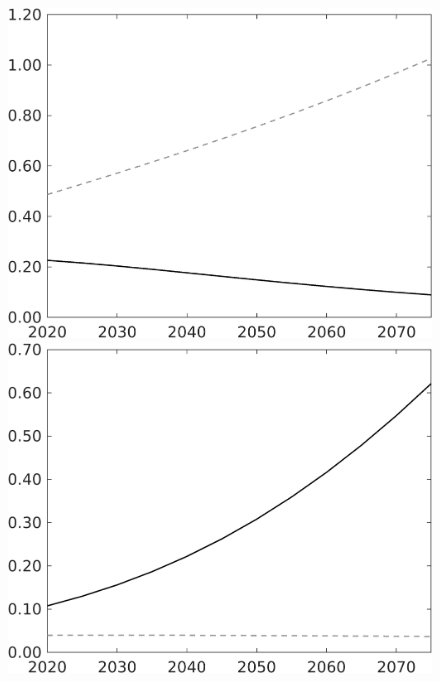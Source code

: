 \documentclass[12pt]{article}
\begin{document}
\begin{figure}[h!!]
\begin{minipage}[]{0.32\textwidth}
	\end{minipage}	
	\begin{minipage}[]{0.32\textwidth}
		\includegraphics[width=1\textwidth]{../../codding_model/own_basedOnFried/optimalPol_010922_revision/figures/all_13Sept22/LevTaufNoTauf_TaulCalib_Equlab_regime0_F_spillover0_nsk1_xgr0_knspil1_sep1_LFlimit0_emsbase0_countec0_GovRev0_etaa0.79_lgd0.png}
	\end{minipage}	
	\begin{minipage}[]{0.32\textwidth}
		\includegraphics[width=1\textwidth]{../../codding_model/own_basedOnFried/optimalPol_010922_revision/figures/all_13Sept22/LevTaufNoTauf_TaulCalib_Equlab_regime0_G_spillover0_nsk1_xgr0_knspil1_sep1_LFlimit0_emsbase0_countec0_GovRev0_etaa0.79_lgd0.png}

\end{minipage}
\end{figure}
\end{document}
